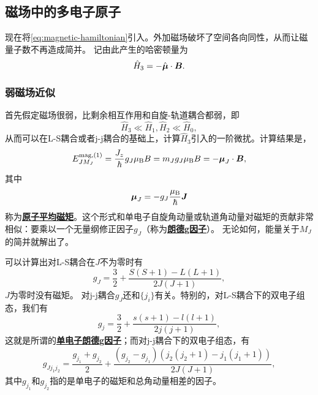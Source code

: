 \documentclass[UTF8, a4paper]{ctexart}
\newcommand*{\concept}[1]{\underline{\textbf{#1}}}
\begin{document}
\subsection{磁场中的多电子原子}

现在将\eqref{eq:magnetic-hamiltonian}引入。外加磁场破坏了空间各向同性，从而让磁量子数不再造成简并。
记由此产生的哈密顿量为
\begin{equation}
    \hat{H}_3 = - \hat{\vb*{\mu}} \cdot \vb*{B}.
\end{equation}

\subsubsection{弱磁场近似}

首先假定磁场很弱，比剩余相互作用和自旋-轨道耦合都弱，即
\begin{equation}
    \hat{H}_3 \ll \hat{H}_1, \hat{H}_2 \ll \hat{H}_0,
\end{equation}
从而可以在L-S耦合或者j-j耦合的基础上，计算$\hat{H}_3$引入的一阶微扰。计算结果是，
\begin{equation}
    E^{\text{mag}, (1)}_{JM_J} = \frac{J_z}{\hbar} g_J \mu_\text{B} B = m_J g_J \mu_\text{B} B = - \vb*{\mu}_J \cdot \vb*{B},
\end{equation}
其中
\begin{equation}
    \vb*{\mu}_J = - g_J \frac{\mu_\text{B}}{\hbar} \vb*{J}
    \label{eq:atom-mean-magnetic}
\end{equation}
称为\concept{原子平均磁矩}。这个形式和单电子自旋角动量或轨道角动量对磁矩的贡献非常相似：要乘以一个无量纲修正因子$g_J$（称为\concept{朗德g因子}）。
无论如何，能量关于$M_J$的简并就解出了。

可以计算出对L-S耦合在$J$不为零时有
\begin{equation}
    g_J = \frac{3}{2} + \frac{S(S+1) - L(L+1)}{2J(J+1)},
    \label{eq:g-factor-ls}
\end{equation}
$J$为零时没有磁矩。
对j-j耦合$g_J$还和$\{j_i\}$有关。特别的，对L-S耦合下的双电子组态，我们有
\begin{equation}
    g_{j} = \frac{3}{2} + \frac{s(s+1) - l(l+1)}{2j(j+1)},
\end{equation}
这就是所谓的\concept{单电子朗德g因子}；而对j-j耦合下的双电子组态，有
\begin{equation}
    g_{J j_1 j_2} = \frac{g_{j_1} + g_{j_2}}{2} + \frac{(g_{j_2} - g_{j_1})(j_2(j_2+1) - j_1(j_1+1))}{2J(J+1)},
\end{equation}
其中$g_{j_1}$和$g_{j_2}$指的是单电子的磁矩和总角动量相差的因子。
\end{document}
